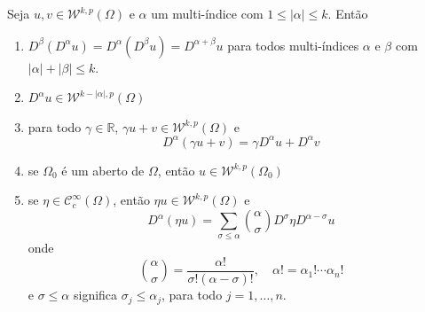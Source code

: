 \documentclass[a4paper, 11pt]{book}
\theoremstyle{definition}
\newcommand{\bR}{\mathbb{R}}
\newcommand{\cC}{\mathcal{C}}
\newcommand{\cW}{\mathcal{W}}
\begin{document}
\begin{tbox} \label{thm:propiedades-derivada-fraca}
    Seja $u, v \in \cW^{k,p}(\Omega)$ e $\alpha$ um multi-índice com $1 \leqslant |\alpha| \leqslant k$.
    Então 
    \begin{enumerate}[leftmargin=*, label=\textbf{(\alph*)}]
        \item $D^\beta(D^\alpha u) = D^\alpha (D^\beta u) = D^{\alpha + \beta} u$ para todos multi-índices $\alpha$ e $\beta$ com $|\alpha| + |\beta| \leqslant k.$
        \item $D^\alpha u \in \cW^{k - |\alpha|,p}(\Omega)$
        \item para todo $\gamma \in \bR$, $\gamma u + v \in \cW^{k,p}(\Omega)$ e
        \[
            D^{\alpha}(\gamma u + v) = \gamma D^\alpha u + D^\alpha v
        \]
        \item se $\Omega_0$ é um aberto de $\Omega$, então $u \in \cW^{k,p}(\Omega_0)$
        \item se $\eta \in \cC^\infty_c(\Omega)$, então $\eta u \in \cW^{k,p}(\Omega)$ e
        \begin{equation} \label{eq:regra-de-leibniz}
            D^\alpha (\eta u) = \sum_{\sigma \leqslant \alpha} \binom{\alpha}{\sigma} D^{\sigma} \eta D^{\alpha - \sigma} u
        \end{equation}
        onde
        \[
            \binom{\alpha}{\sigma} = \frac{\alpha!}{\sigma!(\alpha - \sigma)!}, \quad \alpha! = \alpha_1!\cdots \alpha_n!
        \]
        e $\sigma \leqslant \alpha$ significa $\sigma_j \leqslant \alpha_j$, para todo $j = 1,\dots,n$.
    \end{enumerate}
\end{tbox}
\end{document}
